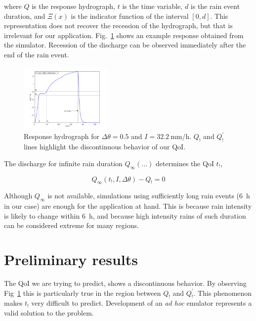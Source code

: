 \documentclass[12pt,a4paper,english,twocolumn,fleqn]{narms}
\newcommand{\jpi}[1]{{\color{Magenta} JPi: #1}}
\begin{document}
\noindent where $Q$ is the response hydrograph, $t$ is the time variable, $d$ is the rain event duration, and $\Xi(x)$ is the indicator function of the interval $[\num{0},d]$.
This representation does not recover the recession of the hydrograph, but that is irrelevant for our application.
Fig.~\ref{img:hydrograph} shows an example response obtained from the simulator.
Recession of the discharge can be observed immediately after the end of the rain event.

\begin{figure}[htpb]
  \centering
  \includegraphics[width=0.4\textwidth]{img/hydrograph.png}
  \caption{Response hydrograph for $\Delta\theta = 0.5$ and $I = \SI{32.2}{\milli\metre\per\hour}$. $Q_!$ and $Q^\prime_!$ lines highlight the discontinuous behavior of our QoI.}
  \label{img:hydrograph}
\end{figure}

The discharge for infinite rain duration $Q_\infty(\ldots)$ determines the QoI $t_!$,

\begin{equation}
Q_\infty (t_!, I, \Delta\theta) - Q_! = 0
\end{equation}

\noindent Although $Q_\infty$ is not available, simulations using sufficiently long rain events (\SI{6}{\hour} in our case) are enough for the application at hand.
This is because rain intensity is likely to change within \SI{6}{\hour}, and because high intensity rains of such duration can be considered extreme for many regions.

\section{Preliminary results}



The QoI we are trying to predict, shows a discontinuous behavior.
By observing Fig~\ref{img:hydrograph} this is particularly true in the region between $Q_!$ and $Q^\prime_!$.
This phenomenon makes $t_!$ very difficult to predict.
Development of an \textit{ad hoc} emulator represents a valid solution to the problem.
\end{document}
